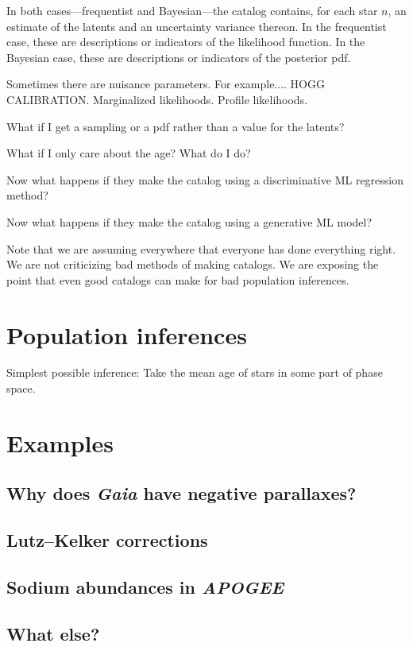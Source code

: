 \documentclass[10pt]{article}
\begin{document}
In both cases---frequentist and Bayesian---the catalog contains, for each star $n$, an estimate of the latents and an uncertainty variance thereon.
In the frequentist case, these are descriptions or indicators of the likelihood function.
In the Bayesian case, these are descriptions or indicators of the posterior pdf.

Sometimes there are nuisance parameters.
For example.... HOGG CALIBRATION.
Marginalized likelihoods.
Profile likelihoods.

What if I get a sampling or a pdf rather than a value for the latents?

What if I only care about the age? What do I do?

Now what happens if they make the catalog using a discriminative ML regression method?

Now what happens if they make the catalog using a generative ML model?

Note that we are assuming everywhere that everyone has done everything right.
We are not criticizing bad methods of making catalogs.
We are exposing the point that even good catalogs can make for bad population inferences.

\section{Population inferences}

Simplest possible inference: Take the mean age of stars in some part of phase space.

\section{Examples}

\subsection{Why does \textsl{Gaia} have negative parallaxes?}

\subsection{Lutz--Kelker corrections}

\subsection{Sodium abundances in \textsl{APOGEE}}

\subsection{What else?}
\end{document}
